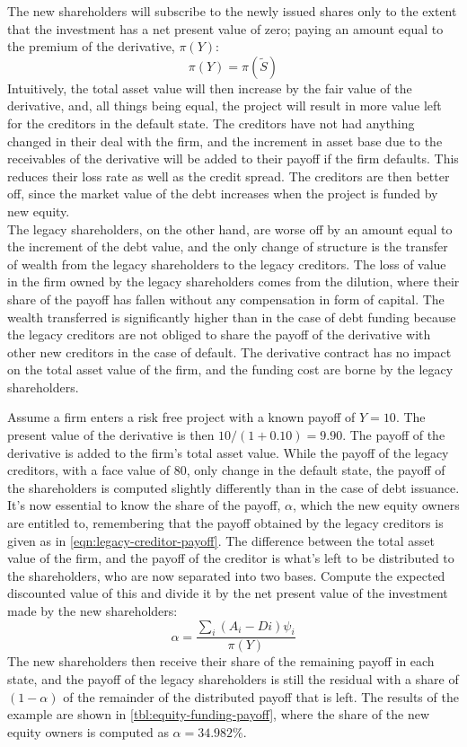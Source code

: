 \documentclass[../main.tex]{subfiles}
\begin{document}
        The new shareholders will subscribe to the newly issued shares only to the extent that the investment has a net present value of zero; paying an amount equal to the premium of the derivative, $\pi(Y)$:
        \begin{equation}
            \pi(Y) = \pi(\tilde{S})
        \end{equation}
        Intuitively, the total asset value will then increase by the fair value of the derivative, and, all things being equal, the project will result in more value left for the creditors in the default state. The creditors have not had anything changed in their deal with the firm, and the increment in asset base due to the receivables of the derivative will be added to their payoff if the firm defaults. This reduces their loss rate as well as the credit spread. The creditors are then better off, since the market value of the debt increases when the project is funded by new equity.\\
        The legacy shareholders, on the other hand, are worse off by an amount equal to the increment of the debt value, and the only change of structure is the transfer of wealth from the legacy shareholders to the legacy creditors. The loss of value in the firm owned by the legacy shareholders comes from the dilution, where their share of the payoff has fallen without any compensation in form of capital. The wealth transferred is significantly higher than in the case of debt funding because the legacy creditors are not obliged to share the payoff of the derivative with other new creditors in the case of default. The derivative contract has no impact on the total asset value of the firm, and the funding cost are borne by the legacy shareholders.

        Assume a firm enters a risk free project with a known payoff of $Y=10$. The present value of the derivative is then $10/(1+0.10)=9.90$. The payoff of the derivative is added to the firm's total asset value. While the payoff of the legacy creditors, with a face value of 80, only change in the default state, the payoff of the shareholders is computed slightly differently than in the case of debt issuance. It's now essential to know the share of the payoff, $\alpha$, which the new equity owners are entitled to, remembering that the payoff obtained by the legacy creditors is given as in \cref{eqn:legacy-creditor-payoff}. The difference between the total asset value of the firm, and the payoff of the creditor is what's left to be distributed to the shareholders, who are now separated into two bases. Compute the expected discounted value of this and divide it by the net present value of the investment made by the new shareholders:
        \begin{equation}
            \alpha = \frac{\sum_i (A_{i}-D{i})\psi_{i}}{\pi(Y)}
        \end{equation}
        The new shareholders then receive their share of the remaining payoff in each state, and the payoff of the legacy shareholders is still the residual with a share of $(1-\alpha)$ of the remainder of the distributed payoff that is left. The results of the example are shown in \cref{tbl:equity-funding-payoff}, where the share of the new equity owners is computed as $\alpha = 34.982\%$.
\end{document}
